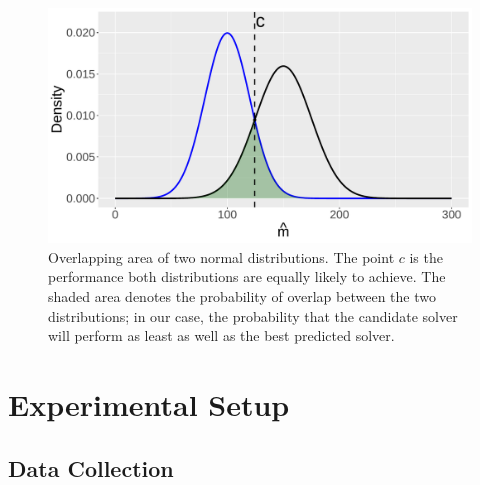 \begin{figure}
\centering
    \centerline{\includegraphics[width=0.8\linewidth]{plots/ovelappingarea.pdf}}
    \caption[Overlapping area of two normal distributions]{Overlapping area of two normal distributions. The point $c$ is the performance both distributions are equally likely to achieve. The shaded area denotes the probability of overlap between the two distributions; in our case, the probability that the candidate solver will perform as least as well as the best predicted solver.}
    \label{fig:overlappingarea}
\end{figure}

\section{Experimental Setup}
\subsection{Data Collection}


